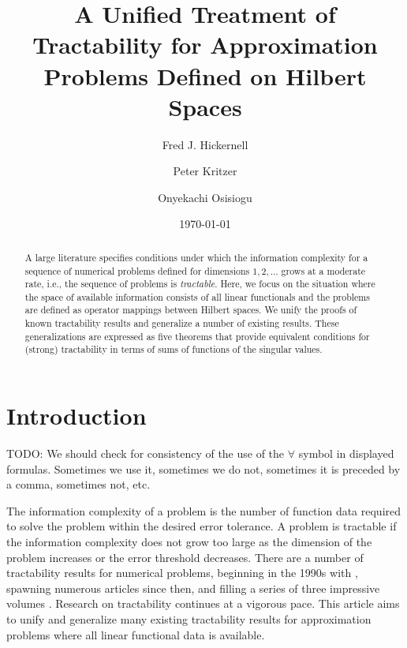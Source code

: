 \documentclass[sort&compress]{elsarticle}
\begin{document}
\title{A Unified Treatment of Tractability for Approximation Problems Defined on Hilbert Spaces}

\author[1]{Fred J. Hickernell}
\author[2]{Peter Kritzer}
\author[1]{Onyekachi Osisiogu}
\date{\today}


\begin{abstract}
    A large literature specifies conditions under which the information complexity for a sequence of numerical problems defined for dimensions $1, 2, \ldots$ grows at a moderate rate, i.e., the sequence of problems is \emph{tractable}.  Here, we focus on the situation where the space of available information consists of all linear functionals and the problems are defined as operator mappings between Hilbert spaces.  We unify the proofs of known tractability results and generalize a number of existing results.  These generalizations are expressed as five theorems that provide equivalent conditions for (strong) tractability in terms of sums of functions of the singular values.
\end{abstract}

\maketitle




\section{Introduction}



\medskip


TODO: We should check for consistency of the use of the $\forall$ symbol in displayed formulas. Sometimes we use it, sometimes we do not, sometimes it is preceded by a comma, sometimes not, etc.

\bigskip

The information complexity of a problem is the number of function data required to solve the problem within the desired error tolerance.  A problem is tractable if the information complexity does not grow too large as the dimension of the problem increases or the error threshold decreases.  There are a number of tractability results for numerical problems, beginning in the 1990s with \cite{W94a,W94b}, spawning numerous articles since then, and filling a series of three impressive volumes \cite{NovWoz08a,NovWoz10a,NovWoz12a}.  Research on tractability continues at a vigorous pace.  This article aims to unify and generalize many existing tractability results for approximation problems where all linear functional data is available.
\end{document}
